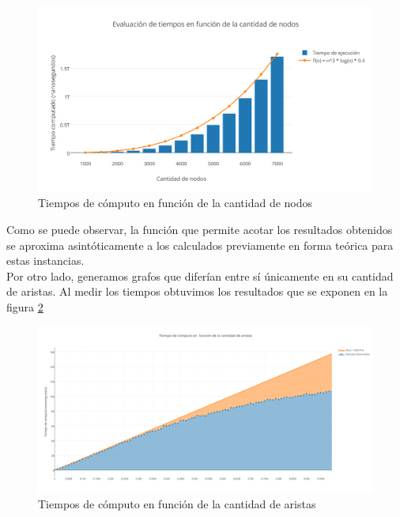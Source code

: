  \begin{figure}[H]
    \begin{center}
  	\includegraphics[width=18cm]{imagenes/ej3/nodostiempo.png}
 	\caption{Tiempos de cómputo en función de la cantidad de nodos}
 	\label{nodostiempo}
    \end{center}
  \end{figure}

Como se puede observar, la función que permite acotar los resultados obtenidos se aproxima asintóticamente a los calculados previamente en forma teórica para estas instancias.\\
Por otro lado, generamos grafos que diferían entre sí únicamente en su cantidad de aristas. Al medir los tiempos obtuvimos los resultados que se exponen en la figura \ref{aristastiempo}

 \begin{figure}[H]
    \begin{center}
  	\includegraphics[width=18cm]{imagenes/ej3/aristastiempo.png}
 	\caption{Tiempos de cómputo en función de la cantidad de aristas}
 	\label{aristastiempo}
    \end{center}
  \end{figure}

